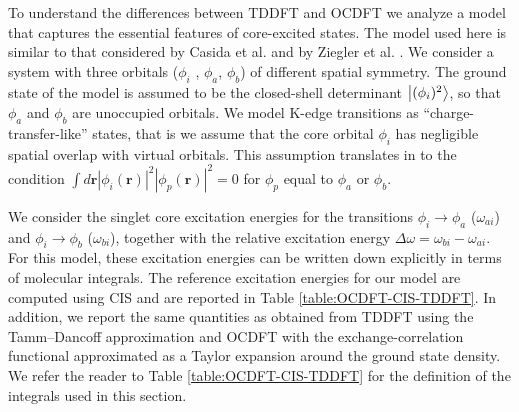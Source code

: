 \documentclass{article}
\begin{document}
To understand the differences between TDDFT and OCDFT we analyze a model that captures the essential features of core-excited states.
The model used here is similar to that considered by Casida et al.\cite{Casida-TDDFT-CT-problem} and by Ziegler et al. \cite{Zeigler-TDDFT-CT-problem}.
We consider a system with three orbitals ($\phi_i$ , $\phi_a$, $\phi_b$) of different spatial symmetry.  The ground state of the model is assumed to be the closed-shell determinant $\ket{(\phi_i)^2}$, so that $\phi_a$ and $\phi_b$ are unoccupied orbitals.
We model K-edge transitions as ``charge-transfer-like'' states, that is we assume that the core orbital $\phi_i$ has negligible spatial overlap with virtual orbitals.  This assumption translates in to the condition $\int d\mathbf{r} |\phi_i(\mathbf{r})|^2 |\phi_p(\mathbf{r})|^2 = 0$ for $\phi_p$ equal to $\phi_a$ or $\phi_b$.

We consider the singlet core excitation energies for the transitions $\phi_i \rightarrow \phi_a$ ($\omega_{ai}$) and $\phi_i \rightarrow \phi_b$ ($\omega_{bi}$), together with the relative excitation energy $\Delta \omega = \omega_{bi} - \omega_{ai}$.
For this model, these excitation energies can be written down explicitly in terms of molecular integrals.\cite{Casida-TDDFT-CT-problem,Zeigler-TDDFT-CT-problem}
The reference excitation energies for our model are computed using CIS and are reported in Table \ref{table:OCDFT-CIS-TDDFT}.
In addition, we report the same quantities as obtained from TDDFT using the Tamm--Dancoff approximation and OCDFT with the exchange-correlation functional approximated as a Taylor expansion around the ground state density.
We refer the reader to Table \ref{table:OCDFT-CIS-TDDFT} for the definition of the integrals used in this section.
\end{document}
